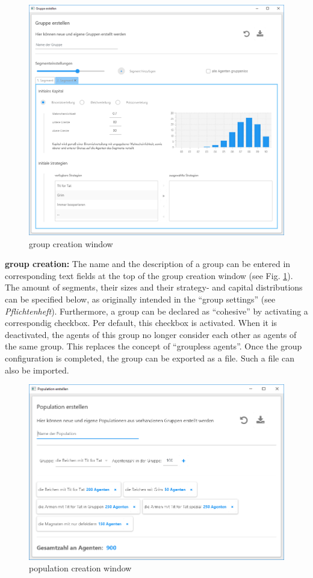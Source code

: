 \documentclass[parskip=full,11pt]{scrartcl}
\begin{document}
\begin{figure}[h]
	\centering
	\includegraphics[width = \linewidth]{images/group_window.png}
	\caption{group creation window}
	\label{fig:group_creation}
\end{figure}
\newpage
\textbf{group creation:}
The name and the description of a group can be entered in corresponding text fields at the top of the group creation window (see Fig. \ref{fig:group_creation}). The amount of segments, their sizes and their strategy- and capital distributions can be specified below, as originally intended in the \enquote{group settings} (see \textit{Pflichtenheft}). Furthermore, a group can be declared as \enquote{cohesive} by activating a correspondig checkbox. Per default, this checkbox is activated. When it is deactivated, the agents of this group no longer consider each other as agents of the same group. This replaces the concept of \enquote{groupless agents}. Once the group configuration is completed, the group can be exported as a file. Such a file can also be imported.

\begin{figure}[h]
	\centering
	\includegraphics[width = \linewidth]{images/population_window.png}
	\caption{population creation window}
	\label{fig:population_creation}
\end{figure}
\end{document}
